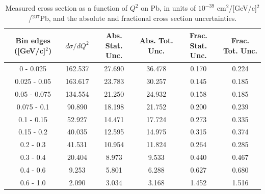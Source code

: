 \documentclass[aps,prl,twocolumn,superscriptaddress,nofootinbib]{revtex4-1}
\begin{document}
\begin{table}[h!]
  \centering
  \caption{Measured cross section as a function of $Q^{2}$ on Pb, in units of
  $10^{-39}$ $\text{cm}^{2}$/[GeV/c]$^{2}$/$^{207}$Pb, and the absolute and
  fractional cross section uncertainties.}
    \begin{tabular}{c||c||c|c||c|c}
      Bin edges ([GeV/c]$^{2}$)  &  $d\sigma/dQ^{2}$  &  Abs. Stat. Unc. & Abs. Tot. Unc.  &  Frac. Stat. Unc.  &  Frac. Tot. Unc. \\
      \hline\hline
         0 - 0.025 & 162.537 & 27.690 & 36.478 & 0.170 & 0.224 \\
      0.025 - 0.05 & 163.617 & 23.783 & 30.257 & 0.145 & 0.185 \\
      0.05 - 0.075 & 134.554 & 21.250 & 24.932 & 0.158 & 0.185 \\
       0.075 - 0.1 & 90.890 & 18.198 & 21.752 & 0.200 & 0.239 \\
        0.1 - 0.15 & 52.927 & 14.471 & 17.724 & 0.273 & 0.335 \\
        0.15 - 0.2 & 40.035 & 12.595 & 14.975 & 0.315 & 0.374 \\
         0.2 - 0.3 & 41.531 & 10.954 & 11.824 & 0.264 & 0.285 \\
         0.3 - 0.4 & 20.404 & 8.973 & 9.533 & 0.440 & 0.467 \\
         0.4 - 0.6 & 9.253 & 5.801 & 6.288 & 0.627 & 0.680 \\
         0.6 - 1.0 & 2.090 & 3.034 & 3.168 & 1.452 & 1.516 \\
    \end{tabular}
  \label{table:Q2XSec_Pb}
\end{table}
\end{document}
